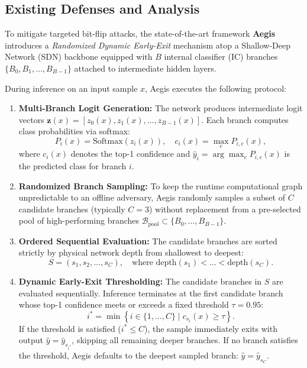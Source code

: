 \documentclass[conference]{IEEEtran}
\begin{document}
\subsection{Existing Defenses and Analysis}

To mitigate targeted bit-flip attacks, the state-of-the-art framework \textbf{Aegis} introduces a \textit{Randomized Dynamic Early-Exit} mechanism atop a Shallow-Deep Network (SDN) backbone equipped with $B$ internal classifier (IC) branches $\{B_0, B_1, \dots, B_{B-1}\}$ attached to intermediate hidden layers.

During inference on an input sample $x$, Aegis executes the following protocol:
\begin{enumerate}
    \item \textbf{Multi-Branch Logit Generation:} The network produces intermediate logit vectors $\mathbf{z}(x) = [z_0(x), z_1(x), \dots, z_{B-1}(x)]$. Each branch computes class probabilities via softmax:
    \begin{equation}
        P_i(x) = \text{Softmax}(z_i(x)), \quad c_i(x) = \max_{c} P_{i, c}(x),
    \end{equation}
    where $c_i(x)$ denotes the top-1 confidence and $\hat{y}_i = \arg\max_c P_{i, c}(x)$ is the predicted class for branch $i$.
    \item \textbf{Randomized Branch Sampling:} To keep the runtime computational graph unpredictable to an offline adversary, Aegis randomly samples a subset of $C$ candidate branches (typically $C = 3$) without replacement from a pre-selected pool of high-performing branches $\mathcal{B}_{\text{pool}} \subset \{B_0, \dots, B_{B-1}\}$.
    \item \textbf{Ordered Sequential Evaluation:} The candidate branches are sorted strictly by physical network depth from shallowest to deepest:
    \begin{equation}
        S = (s_1, s_2, \dots, s_C), \quad \text{where } \text{depth}(s_1) < \dots < \text{depth}(s_C).
    \end{equation}
    \item \textbf{Dynamic Early-Exit Thresholding:} The candidate branches in $S$ are evaluated sequentially. Inference terminates at the first candidate branch whose top-1 confidence meets or exceeds a fixed threshold $\tau = 0.95$:
    \begin{equation}
        i^* = \min \left\{ i \in \{1, \dots, C\} \mid c_{s_i}(x) \ge \tau \right\}.
    \end{equation}
    If the threshold is satisfied ($i^* \le C$), the sample immediately exits with output $\hat{y} = \hat{y}_{s_{i^*}}$, skipping all remaining deeper branches. If no branch satisfies the threshold, Aegis defaults to the deepest sampled branch: $\hat{y} = \hat{y}_{s_C}$.
\end{enumerate}
\end{document}
